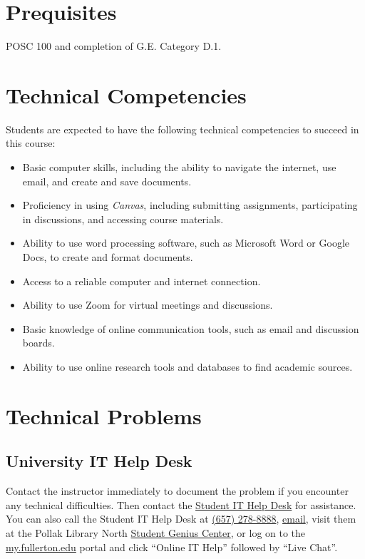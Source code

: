 \documentclass[12pt, letterpaper]{article}
\begin{document}
\section*{Prequisites}

POSC 100 and completion of G.E. Category D.1. 

\section*{Technical Competencies}

Students are expected to have the following technical competencies to succeed in this course:
\begin{itemize}
    \item Basic computer skills, including the ability to navigate the internet, use email, and create and save documents.
    \item Proficiency in using \emph{Canvas}, including submitting assignments, participating in discussions, and accessing course materials.
    \item Ability to use word processing software, such as Microsoft Word or Google Docs, to create and format documents.
    \item Access to a reliable computer and internet connection.
    \item Ability to use Zoom for virtual meetings and discussions.
    \item Basic knowledge of online communication tools, such as email and discussion boards.
    \item Ability to use online research tools and databases to find academic sources.
\end{itemize}

\section*{Technical Problems}

\subsection*{University IT Help Desk}

Contact the instructor immediately to document the problem if you encounter any technical difficulties. Then contact the \href{http://www.fullerton.edu/it/students/helpdesk/index.php}{Student IT Help Desk} for assistance. You can also call the Student IT Help Desk at \href{tel:+16572788888}{(657) 278-8888}, \href{mailto:StudentITHelpDesk@fullerton.edu}{email}, visit them at the Pollak Library North \href{http://www.fullerton.edu/it/students/sgc/index.php}{Student Genius Center}, or log on to the \href{http://my.fullerton.edu/}{my.fullerton.edu} portal and click ``Online IT Help'' followed by ``Live Chat''.
\end{document}
